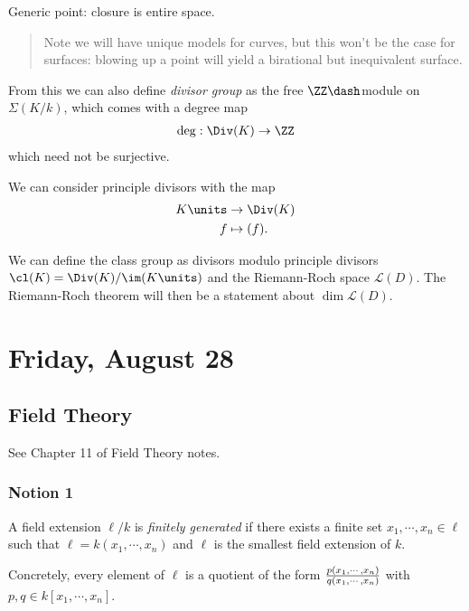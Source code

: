 \begin{definition}[?]

Generic point: closure is entire space.

\end{definition}

\begin{quote}
Note we will have unique models for curves, but this won't be the case
for surfaces: blowing up a point will yield a birational but
inequivalent surface.
\end{quote}

From this we can also define \emph{divisor group} as the free
\(\ZZ\dash\)module on \(\Sigma(K/k)\), which comes with a degree map
\begin{align*}  
\deg: \Div(K) \to \ZZ
\end{align*} which need not be surjective.

We can consider principle divisors with the map
\begin{align*}  
K\units &\to \Div(K) \\
f &\mapsto (f)
.\end{align*}

We can define the class group as divisors modulo principle divisors
\(\cl(K) = \Div(K) / \im(K\units)\) and the Riemann-Roch space
\(\mathcal{L}(D)\). The Riemann-Roch theorem will then be a statement
about \(\dim \mathcal{L}(D)\).

\hypertarget{friday-august-28}{%
\section{Friday, August 28}\label{friday-august-28}}

\hypertarget{field-theory}{%
\subsection{Field Theory}\label{field-theory}}

See Chapter 11 of Field Theory notes.

\hypertarget{notion-1}{%
\subsubsection{Notion 1}\label{notion-1}}

\begin{definition}

A field extension \(\ell/k\) is \emph{finitely generated} if there
exists a finite set \(x_1, \cdots, x_n \in \ell\) such that
\(\ell = k(x_1, \cdots, x_n)\) and \(\ell\) is the smallest field
extension of \(k\).

Concretely, every element of \(\ell\) is a quotient of the form
\({p(x_1, \cdots, x_n) \over q(x_1, \cdots, x_n)}\) with
\(p, q\in k[x_1, \cdots, x_n]\).

\end{definition}


